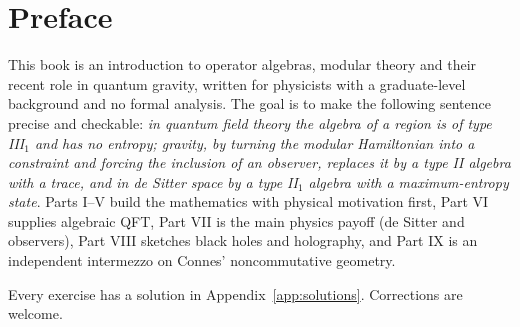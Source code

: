 \chapter*{Preface}
This book is an introduction to operator algebras, modular theory and their recent role in quantum gravity, written for physicists with a graduate-level background and no formal analysis. The goal is to make the following sentence precise and checkable: \emph{in quantum field theory the algebra of a region is of type III$_1$ and has no entropy; gravity, by turning the modular Hamiltonian into a constraint and forcing the inclusion of an observer, replaces it by a type II algebra with a trace, and in de Sitter space by a type II$_1$ algebra with a maximum-entropy state}. Parts I--V build the mathematics with physical motivation first, Part VI supplies algebraic QFT, Part VII is the main physics payoff (de Sitter and observers), Part VIII sketches black holes and holography, and Part IX is an independent intermezzo on Connes' noncommutative geometry.

Every exercise has a solution in Appendix~\ref{app:solutions}. Corrections are welcome.

